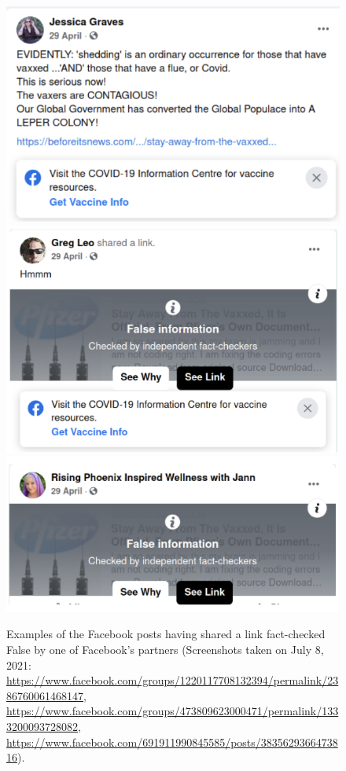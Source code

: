 \documentclass{article}
\begin{document}
\begin{figure}
\centering
\includegraphics[scale=0.35]{./img/fb_flags/fb_flag_1.png}
\includegraphics[scale=0.35]{./img/fb_flags/fb_flag_2.png}
\includegraphics[scale=0.45]{./img/fb_flags/fb_flag_3.png}
\caption{Examples of the Facebook posts having shared a link fact-checked False by one of Facebook’s partners (Screenshots taken on July 8, 2021: \href{https://www.facebook.com/groups/1220117708132394/permalink/2386760061468147}{https://www.facebook.com/groups/1220117708132394/permalink/2386760061468147},  \href{https://www.facebook.com/groups/473809623000471/permalink/1333200093728082}{https://www.facebook.com/groups/473809623000471/permalink/1333200093728082}, \href{https://www.facebook.com/691911990845585/posts/3835629366473816}{https://www.facebook.com/691911990845585/posts/3835629366473816}).} 
\label{fb_flags}
\end{figure}
\end{document}
